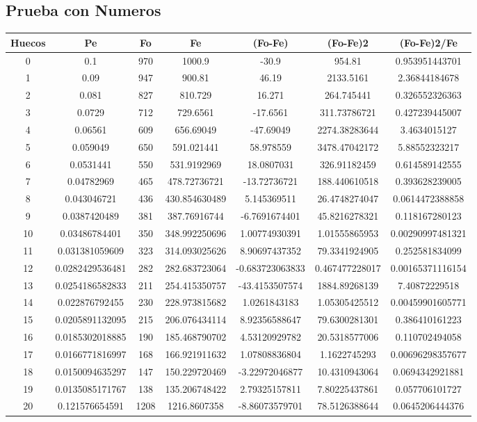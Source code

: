 \documentclass{article}
\begin{document}
\subsection{Prueba con Numeros}
\begin{tabular}{|c|c|c|c|c|c|c|}
Huecos&Pe&Fo&Fe&(Fo{-}Fe)&(Fo{-}Fe)2&(Fo{-}Fe)2/Fe\\
\hline
0&0.1&970&1000.9&{-}30.9&954.81&0.953951443701\\
\hline
1&0.09&947&900.81&46.19&2133.5161&2.36844184678\\
\hline
2&0.081&827&810.729&16.271&264.745441&0.326552326363\\
\hline
3&0.0729&712&729.6561&{-}17.6561&311.73786721&0.427239445007\\
\hline
4&0.06561&609&656.69049&{-}47.69049&2274.38283644&3.4634015127\\
\hline
5&0.059049&650&591.021441&58.978559&3478.47042172&5.88552323217\\
\hline
6&0.0531441&550&531.9192969&18.0807031&326.91182459&0.614589142555\\
\hline
7&0.04782969&465&478.72736721&{-}13.72736721&188.440610518&0.393628239005\\
\hline
8&0.043046721&436&430.854630489&5.145369511&26.4748274047&0.0614472388858\\
\hline
9&0.0387420489&381&387.76916744&{-}6.7691674401&45.8216278321&0.118167280123\\
\hline
10&0.03486784401&350&348.992250696&1.00774930391&1.01555865953&0.00290997481321\\
\hline
11&0.031381059609&323&314.093025626&8.90697437352&79.3341924905&0.252581834099\\
\hline
12&0.0282429536481&282&282.683723064&{-}0.683723063833&0.467477228017&0.00165371116154\\
\hline
13&0.0254186582833&211&254.415350757&{-}43.4153507574&1884.89268139&7.40872229518\\
\hline
14&0.022876792455&230&228.973815682&1.0261843183&1.05305425512&0.00459901605771\\
\hline
15&0.0205891132095&215&206.076434114&8.92356588647&79.6300281301&0.386410161223\\
\hline
16&0.0185302018885&190&185.468790702&4.53120929782&20.5318577006&0.110702494058\\
\hline
17&0.0166771816997&168&166.921911632&1.07808836804&1.1622745293&0.00696298357677\\
\hline
18&0.0150094635297&147&150.229720469&{-}3.22972046877&10.4310943064&0.0694342921881\\
\hline
19&0.0135085171767&138&135.206748422&2.79325157811&7.80225437861&0.057706101727\\
\hline
20&0.121576654591&1208&1216.8607358&{-}8.86073579701&78.5126388644&0.0645206444376\\
\end{tabular}
\end{document}
